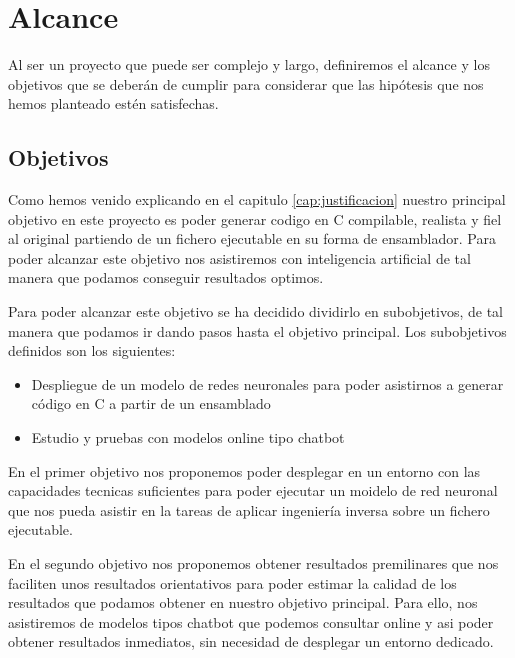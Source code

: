 \chapter{Alcance}
\label{cap:alcance}


Al ser un proyecto que puede ser complejo y largo, definiremos el alcance y los objetivos que se deberán de cumplir para considerar que las hipótesis que nos
hemos planteado estén satisfechas.

\section{Objetivos}
\label{sec:objetivos}


Como hemos venido explicando en el capitulo \ref{cap:justificacion} nuestro principal objetivo en este proyecto es poder generar codigo en C compilable, realista y fiel 
al original partiendo de un fichero ejecutable en su forma de ensamblador. Para poder alcanzar este objetivo nos asistiremos con inteligencia artificial de tal manera
que podamos conseguir resultados optimos.

Para poder alcanzar este objetivo se ha decidido dividirlo en subobjetivos, de tal manera que podamos ir dando pasos hasta el objetivo principal.
Los subobjetivos definidos son los siguientes:

\begin{itemize}
    \item Despliegue de un modelo de redes neuronales para poder asistirnos a generar código en C a partir de un ensamblado
    \item Estudio y pruebas con modelos online tipo chatbot
\end{itemize}

En el primer objetivo nos proponemos poder desplegar en un entorno con las capacidades tecnicas suficientes para poder ejecutar un moidelo de red neuronal que nos
pueda asistir en la tareas de aplicar ingeniería inversa sobre un fichero ejecutable.

En el segundo objetivo nos proponemos obtener resultados premilinares que nos faciliten unos resultados orientativos para poder estimar la calidad de los resultados que podamos
obtener en nuestro objetivo principal. Para ello, nos asistiremos de modelos tipos chatbot que podemos consultar online y asi poder obtener resultados inmediatos, sin necesidad 
de desplegar un entorno dedicado.

